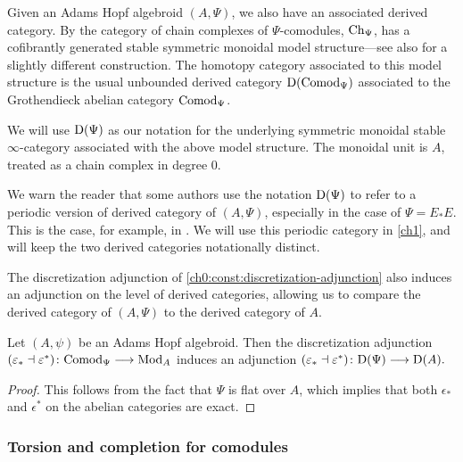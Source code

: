 Given an Adams Hopf algebroid $(A, \Psi)$, we also have an associated derived category. By \cite[2.1.2, 2.1.3]{hovey_04} the category of chain complexes of $\Psi$-comodules, $\mathrm{Ch}_\Psi$, has a cofibrantly generated stable symmetric monoidal model structure---see also \cite{barnes-roitzheim_2011} for a slightly different construction. The homotopy category associated to this model structure is the usual unbounded derived category $\mathrm{D}(\mathrm{Comod}_\Psi)$ associated to the Grothendieck abelian category $\mathrm{Comod}_\Psi$. 

\begin{notation}
    We will use $\mathrm{D}(\Psi)$ as our notation for the underlying symmetric monoidal stable $\infty$-category associated with the above model structure. The monoidal unit is $A$, treated as a chain complex in degree $0$.
\end{notation}

\begin{remark}
    We warn the reader that some authors use the notation $\mathrm{D}(\Psi)$ to refer to a periodic version of derived category of $(A, \Psi)$, especially in the case of $\Psi = E_*E$. This is the case, for example, in \cite{pstragowski_2021}. We will use this periodic category in \cref{ch1}, and will keep the two derived categories notationally distinct. 
\end{remark}

The discretization adjunction of \cref{ch0:const:discretization-adjunction} also induces an adjunction on the level of derived categories, allowing us to compare the derived category of $(A, \Psi)$ to the derived category of $A$. 

\begin{proposition}
    Let $(A,\psi)$ be an Adams Hopf algebroid. Then the discretization adjunction $(\varepsilon_*\dashv \varepsilon^*)\colon \mathrm{Comod}_\Psi\longrightarrow \mathrm{Mod}_A$ induces an adjunction $(\varepsilon_*\dashv \varepsilon^*)\colon \mathrm{D}(\Psi)\longrightarrow \mathrm{D}(A).$
\end{proposition}
\begin{proof}
    This follows from the fact that $\Psi$ is flat over $A$, which implies that both $\epsilon_*$ and $\epsilon^*$ on the abelian categories are exact. 
\end{proof}




\subsubsection{Torsion and completion for comodules}
\label{ch0:sssec:torsion-and-completion-for-comodules}

